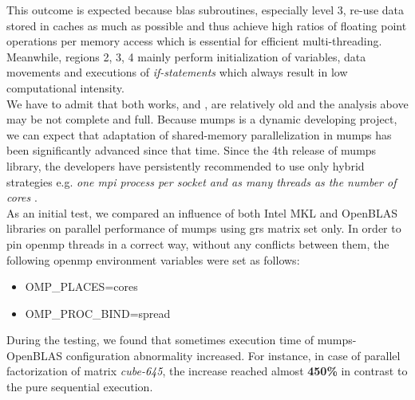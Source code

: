This outcome is expected because \acrshort{blas} subroutines, especially level 3, re-use data stored in caches as much as possible and thus achieve high ratios of floating point operations per memory access which is essential for efficient multi-threading. Meanwhile, regions 2, 3, 4 mainly perform initialization of variables, data movements and executions of \textit{if-statements} which always result in low computational intensity.\\



We have to admit that both works, \cite{chowdhury2010some} and \cite{l2013introduction}, are relatively old and the analysis above may be not complete and full. Because \acrshort{mumps} is a dynamic developing project, we can expect that adaptation of shared-memory parallelization in \acrshort{mumps} has been significantly advanced since that time. Since the 4th release of \acrshort{mumps} library, the developers have persistently recommended to use only hybrid strategies e.g. \textit{one \acrshort{mpi} process per socket and as many threads as the number of cores} \cite{mumps-manual}.\\


As an initial test, we compared an influence of both Intel MKL and OpenBLAS libraries on parallel performance of \acrshort{mumps} using \acrshort{grs} matrix set only. In order to pin \acrshort{openmp} threads in a correct way, without any conflicts between them, the following \acrshort{openmp} environment variables were set as follows:

\begin{itemize}
	\item OMP\_PLACES=cores
	\item OMP\_PROC\_BIND=spread
\end{itemize} 


During the testing, we found that sometimes execution time of \acrshort{mumps}-OpenBLAS configuration abnormality increased. For instance, in case of parallel factorization of matrix \textit{cube-645}, the increase reached almost \textbf{450\%} in contrast to the pure sequential execution. \\

